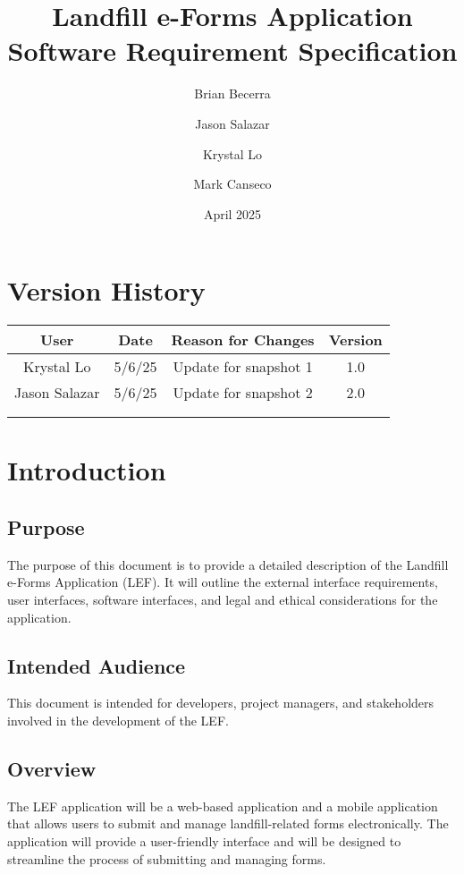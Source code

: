 \documentclass[12pt]{article}
\title{Landfill e-Forms Application\\
Software Requirement Specification}
\author{
    Brian Becerra\\
    \and
    Jason Salazar\\
    \and
    Krystal Lo\\
    \and
    Mark Canseco\\
    }
\date{April 2025}
\begin{document}
\begin{titlepage}
\maketitle
\thispagestyle{empty}
\end{titlepage}

\thispagestyle{empty}
\tableofcontents
\newpage

\section*{Version History}
\begin{table}[ht]
    \centering
    \begin{tabular}{|c|c|c|c|}
    \hline
    \textbf{User} & \textbf{Date} & \textbf{Reason for Changes} & \textbf{Version}\\
    \hline
         Krystal Lo & 5/6/25  & Update for snapshot 1 & 1.0\\
    \hline
        Jason Salazar & 5/6/25 & Update for snapshot 2 & 2.0\\
    \hline
         &  &  & \\
    \hline
         &  &  & \\
    \hline
    \end{tabular}
\end{table}
\newpage

\section{Introduction}
\subsection{Purpose}
The purpose of this document is to provide a detailed description of the Landfill e-Forms Application (LEF). It will outline the external interface requirements, user interfaces, software interfaces, and legal and ethical considerations for the application. 
\subsection{Intended Audience}
This document is intended for developers, project managers, and stakeholders involved in the development of the LEF.
\subsection{Overview}
The LEF application will be a web-based application and a mobile application that allows users to submit and manage landfill-related forms electronically. The application will provide a user-friendly interface and will be designed to streamline the process of submitting and managing forms.
\newpage
\end{document}
